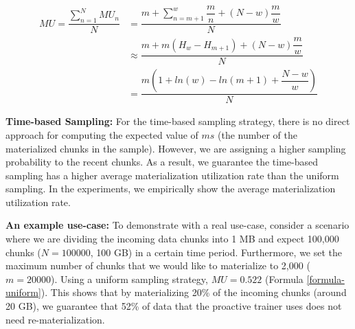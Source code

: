 \begin{equation} \label{formula-window-based}
\begin{aligned}
MU=\dfrac{\sum\limits_{n=1}^N MU_n}{N}
&=\dfrac{m + \sum\limits_{n = m+1}^{w} \dfrac{m}{n} + (N-w)\dfrac{m}{w} }{N} \\
&\approx\dfrac{m  +  m (H_w - H_{m+1}) + (N-w)\dfrac{m}{w}}{N}\\
&=\dfrac{m(1 + ln(w) - ln(m+1) + \dfrac{N-w}{w})}{N}
\end{aligned}
\end{equation}

\textbf{Time-based Sampling:}
For the time-based sampling strategy, there is no direct approach for computing the expected value of $ms$ (the number of the materialized chunks in the sample).
However, we are assigning a higher sampling probability to the recent chunks.
As a result, we guarantee the time-based sampling has a higher average materialization utilization rate than the uniform sampling.
In the experiments, we empirically show the average materialization utilization rate.

\textbf{An example use-case:}
To demonstrate with a real use-case, consider a scenario where we are dividing the incoming data chunks into 1 MB and expect 100,000 chunks ($N = 100000$, 100 GB) in a certain time period.
Furthermore, we set the maximum number of chunks that we would like to materialize to 2,000 ($m=20000$).
Using a uniform sampling strategy, $MU =0.522 $ (Formula \ref{formula-uniform}).
This shows that by materializing 20\% of the incoming chunks (around 20 GB), we guarantee that 52\% of data that the proactive trainer uses does not need re-materialization.


